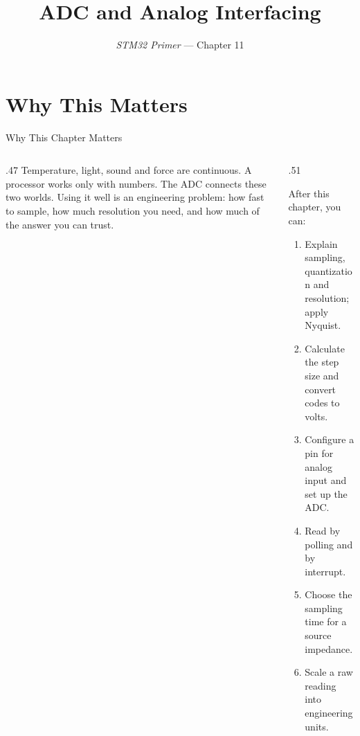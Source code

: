 \documentclass[9pt,aspectratio=169,xcolor=table]{beamer}
\title{ADC and Analog Interfacing}
\subtitle{\emph{STM32 Primer} --- Chapter 11}
\begin{document}
\titlepage

\section{Why This Matters}

\begin{frame}{Why This Chapter Matters}
    \begin{columns}[T]
    \begin{column}{.47\textwidth}
        {\normalsize Temperature, light, sound and force are continuous. A processor works only with numbers. The ADC connects these two worlds. Using it well is an engineering problem: how fast to sample, how much resolution you need, and how much of the answer you can trust.}
    \end{column}
    \begin{column}{.51\textwidth}
        \begin{block}{After this chapter, you can:}
        {\small
        \begin{enumerate}\itemsep2pt
            \item Explain sampling, quantization and resolution; apply Nyquist.
            \item Calculate the step size and convert codes to volts.
            \item Configure a pin for analog input and set up the ADC.
            \item Read by polling and by interrupt.
            \item Choose the sampling time for a source impedance.
            \item Scale a raw reading into engineering units.
        \end{enumerate}}
        \end{block}
    \end{column}
    \end{columns}
\end{frame}
\end{document}
